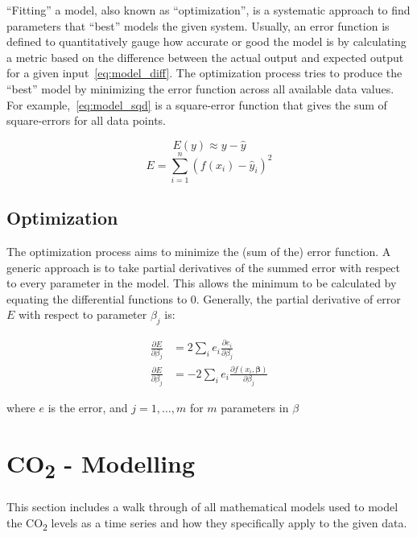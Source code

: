 \documentclass{mcmthesis}
\begin{document}
    ``Fitting'' a model, also known as ``optimization'', is a systematic approach to find parameters that ``best'' models the given system. Usually, an error function is defined to quantitatively gauge how accurate or good the model is by calculating a metric based on the difference between the actual output and expected output for a given input~\eqref{eq:model_diff}. The optimization process tries to produce the ``best'' model by minimizing the error function across all available data values. For example,~\eqref{eq:model_sqd} is a square-error function that gives the sum of square-errors for all data points.

    \begin{equation}
        E(y) \approx y - \hat y
        \label{eq:model_diff}
    \end{equation}
    \begin{equation}
        E = \sum_{i=1}^{n} (f(x_i) - \hat y_i)^2
        \label{eq:model_sqd}
    \end{equation}

    \subsection{Optimization}

    The optimization process aims to minimize the (sum of the) error function.
    A generic approach is to take partial derivatives of the summed error with respect to every parameter in the model. This allows the minimum to be calculated by equating the differential functions to 0.
    Generally, the partial derivative of error $E$ with respect to parameter $\beta_j$ is:

    \begin{equation}
        \begin{aligned}
            \frac{\partial E}{\partial \beta_j} &= 2 \sum_i e_i \frac{\partial e_i}{\partial \beta_j} \\
            \frac{\partial E}{\partial \beta_j} &= -2\sum_i e_i\frac{\partial f(x_i,\boldsymbol \beta)}{\partial \beta_j}
        \end{aligned}
    \end{equation}

    \noindent where $e$ is the error, and $j = 1, \ldots, m$ for $m$ parameters in $\beta$

%


    \section{CO\textsubscript{2} - Modelling}
    This section includes a walk through of all mathematical models used to model the CO\textsubscript{2} levels as a time series and how they specifically apply to the given data.
\end{document}
